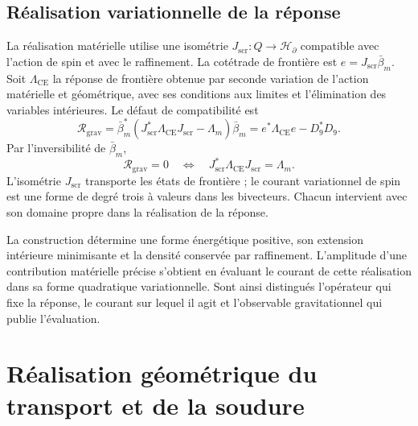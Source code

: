 \section{Réalisation variationnelle de la réponse}
\label{x_reciprocidad:vii:sec:realizacion-respuesta}

La réalisation matérielle utilise une isométrie \(J_{\mathrm{scr}}:Q\longrightarrow\mathcal H_\partial\) compatible avec l'action de spin et avec le raffinement. La cotétrade de frontière est \(e=J_{\mathrm{scr}}\bar\beta_m\). Soit \(\Lambda_{\mathrm{CE}}\) la réponse de frontière obtenue par seconde variation de l'action matérielle et géométrique, avec ses conditions aux limites et l'élimination des variables intérieures. Le défaut de compatibilité est
\begin{equation}
 \mathcal R_{\mathrm{grav}}
 =\bar\beta_m^*
   (J_{\mathrm{scr}}^*\Lambda_{\mathrm{CE}}J_{\mathrm{scr}}-\Lambda_m)
   \bar\beta_m
 =e^*\Lambda_{\mathrm{CE}}e-D_9^*D_9.
 \label{x_reciprocidad:vii:eq:defecto-respuesta}
\end{equation}
Par l'inversibilité de \(\bar\beta_m\),
\[
 \mathcal R_{\mathrm{grav}}=0
 \quad\Longleftrightarrow\quad
 J_{\mathrm{scr}}^*\Lambda_{\mathrm{CE}}J_{\mathrm{scr}}=\Lambda_m.
\]
L'isométrie \(J_{\mathrm{scr}}\) transporte les états de frontière ;
le courant variationnel de spin est une forme de degré trois à valeurs
dans les bivecteurs. Chacun intervient avec son domaine propre dans la
réalisation de la réponse.

La construction détermine une forme énergétique positive, son extension
intérieure minimisante et la densité conservée par raffinement.
L'amplitude d'une contribution matérielle précise s'obtient en évaluant
le courant de cette réalisation dans sa forme quadratique variationnelle.
Sont ainsi distingués l'opérateur qui fixe la réponse, le courant
sur lequel il agit et l'observable gravitationnel qui publie l'évaluation.




\chapter{Réalisation géométrique du transport et de la soudure}
\label{x_reciprocidad:vii:sec:realizacion-cartan}


